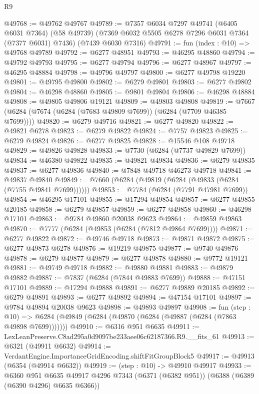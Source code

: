 \begin{lexlean}{R9}
\begin{coremodule}
@49768 := @49762 @49767
@49789 := @7357
    @6034
    @7297
    @49741
    (@6405 @6031 @7364)
    (@58 @49739)
    (@7369 @6032 @5505 @6278 @7296 @6031 @7364 (@7377 @6031) @7436)
    (@7439 @6030 @7316)
@49791 := fun (index : @10) => @49768 @49789
@49792 := @6277 @48951
@49793 := @46295 @48860
@49794 := @49792 @49793
@49795 := @6277 @49794
@49796 := @6277 @48967
@49797 := @46295 @48884
@49798 := @49796 @49797
@49800 := @6277 @49798 @19220
@49801 := @49795 @49800
@49802 := @6279 @49801
@49803 := @6277 @49802
@49804 := @46298 @48860
@49805 := @9801 @49804
@49806 := @46298 @48884
@49808 := @49805 @49806 @19121
@49809 := @49803 @49808
@49819 := @7667 (@6284 (@7674 (@6284 (@7683 @49809 @7699)) (@6284 (@7709 @46385 @7699))))
@49820 := @6279 @49716
@49821 := @6277 @49820
@49822 := @49821 @6278
@49823 := @6279 @49822
@49824 := @7757 @49823
@49825 := @6279 @49824
@49826 := @6277 @49825
@49828 := @15546 @108 @49718
@49829 := @49826 @49828
@49833 := @7730 (@6284 (@7737 @49829 @7699))
@49834 := @46380 @49822
@49835 := @49821 @49834
@49836 := @6279 @49835
@49837 := @6277 @49836
@49840 := @7848 @49718 @46273 @49718
@49841 := @49837 @49840
@49849 := @7660 (@6284 (@49819 (@6284 (@49833 (@6284 (@7755 @49841 @7699))))))
@49853 := @7784 (@6284 (@7791 @47981 @7699))
@49854 := @46295 @17101
@49855 := @17294 @49854
@49857 := @6277 @49855 @20185
@49858 := @6279 @49857
@49859 := @6277 @49858
@49860 := @46298 @17101
@49863 := @9784 @49860 @20038 @9623
@49864 := @49859 @49863
@49870 := @7777 (@6284 (@49853 (@6284 (@7812 @49864 @7699))))
@49871 := @6277 @49822
@49872 := @49746 @49718
@49873 := @49871 @49872
@49875 := @6277 @49873 @6278
@49876 := @19219 @49875
@49877 := @9740 @49876
@49878 := @6279 @49877
@49879 := @6277 @49878
@49880 := @9772 @19121
@49881 := @49749 @49718
@49882 := @49880 @49881
@49883 := @49879 @49882
@49887 := @7837 (@6284 (@7844 @49883 @7699))
@49888 := @47151 @17101
@49889 := @17294 @49888
@49891 := @6277 @49889 @20185
@49892 := @6279 @49891
@49893 := @6277 @49892
@49894 := @47154 @17101
@49897 := @9784 @49894 @20038 @9623
@49898 := @49893 @49897
@49908 := fun (step : @10) =>
  @6284 (@49849 (@6284 (@49870 (@6284 (@49887 (@6284 (@7863 @49898 @7699)))))))
@49910 := @6316 @951 @6635
@49911 := LexLeanPreserve.C8ad295a0d9097be233aee06c62187366.R9.__fits_61
@49913 := @6321 (@49911 @6632)
@49914 := VerdantEngine.ImportanceGridEncoding.shiftFitGroupBlock5
@49917 := @49913 (@6354 (@49914 @6632))
@49919 := (step : @10) -> @49910 @49917
@49933 := @6360
    @951
    @6635
    @49917
    @4296
    @7343
    (@6371 (@6382 @951))
    (@6388 (@6389 (@6390 @4296) @6635 @6366))

\end{coremodule}
\end{lexlean}
